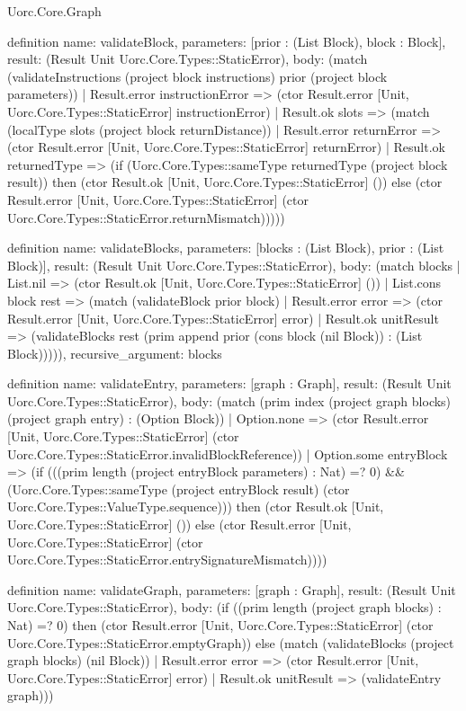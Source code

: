 \begin{lexlean}{Uorc.Core.Graph}
\begin{semanticmodule}
definition{
  name: validateBlock,
  parameters: [prior : (List Block), block : Block],
  result: (Result Unit Uorc.Core.Types::StaticError),
  body: (match (validateInstructions (project block instructions) prior (project block parameters))
    | Result.error instructionError => (ctor Result.error [Unit, Uorc.Core.Types::StaticError] instructionError)
    | Result.ok slots => (match (localType slots (project block returnDistance))
      | Result.error returnError => (ctor Result.error [Unit, Uorc.Core.Types::StaticError] returnError)
      | Result.ok returnedType => (if (Uorc.Core.Types::sameType returnedType (project block result)) then (ctor Result.ok [Unit, Uorc.Core.Types::StaticError] ()) else (ctor Result.error [Unit, Uorc.Core.Types::StaticError] (ctor Uorc.Core.Types::StaticError.returnMismatch)))))
}

definition{
  name: validateBlocks,
  parameters: [blocks : (List Block), prior : (List Block)],
  result: (Result Unit Uorc.Core.Types::StaticError),
  body: (match blocks
    | List.nil => (ctor Result.ok [Unit, Uorc.Core.Types::StaticError] ())
    | List.cons block rest => (match (validateBlock prior block)
      | Result.error error => (ctor Result.error [Unit, Uorc.Core.Types::StaticError] error)
      | Result.ok unitResult => (validateBlocks rest (prim append prior (cons block (nil Block)) : (List Block))))),
  recursive_argument: blocks
}

definition{
  name: validateEntry,
  parameters: [graph : Graph],
  result: (Result Unit Uorc.Core.Types::StaticError),
  body: (match (prim index (project graph blocks) (project graph entry) : (Option Block))
    | Option.none => (ctor Result.error [Unit, Uorc.Core.Types::StaticError] (ctor Uorc.Core.Types::StaticError.invalidBlockReference))
    | Option.some entryBlock => (if (((prim length (project entryBlock parameters) : Nat) =? 0) && (Uorc.Core.Types::sameType (project entryBlock result) (ctor Uorc.Core.Types::ValueType.sequence))) then (ctor Result.ok [Unit, Uorc.Core.Types::StaticError] ()) else (ctor Result.error [Unit, Uorc.Core.Types::StaticError] (ctor Uorc.Core.Types::StaticError.entrySignatureMismatch))))
}

definition{
  name: validateGraph,
  parameters: [graph : Graph],
  result: (Result Unit Uorc.Core.Types::StaticError),
  body: (if ((prim length (project graph blocks) : Nat) =? 0) then (ctor Result.error [Unit, Uorc.Core.Types::StaticError] (ctor Uorc.Core.Types::StaticError.emptyGraph)) else (match (validateBlocks (project graph blocks) (nil Block))
    | Result.error error => (ctor Result.error [Unit, Uorc.Core.Types::StaticError] error)
    | Result.ok unitResult => (validateEntry graph)))
}


\end{semanticmodule}
\end{lexlean}
